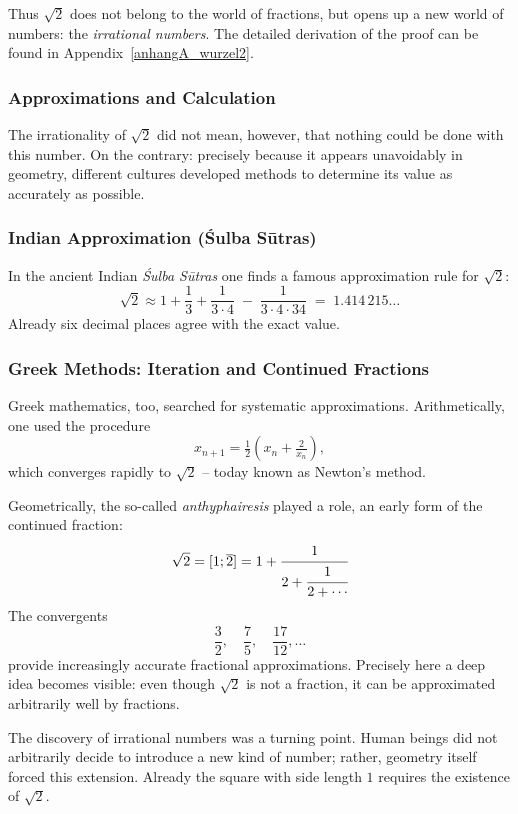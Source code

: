 Thus $\sqrt{2}$ does not belong to the world of fractions,
but opens up a new world of numbers:
the \emph{irrational numbers}.
The detailed derivation of the proof can be found in
Appendix~\ref{anhangA_wurzel2}.

\subsubsection*{Approximations and Calculation}
The irrationality of $\sqrt{2}$ did not mean, however,
that nothing could be done with this number.
On the contrary:
precisely because it appears unavoidably in geometry,
different cultures developed methods
to determine its value as accurately as possible.

\subsubsection*{Indian Approximation (Śulba Sūtras)}
In the ancient Indian \emph{Śulba Sūtras}
one finds a famous approximation rule for $\sqrt{2}$:
\[
\sqrt{2}\approx 1+\frac{1}{3}+\frac{1}{3\cdot 4}\;-\;\frac{1}{3\cdot 4\cdot 34}
\;=\;1.414\,215\ldots
\]
Already six decimal places agree with the exact value.

\subsubsection*{Greek Methods: Iteration and Continued Fractions}
Greek mathematics, too, searched for systematic approximations.
Arithmetically, one used the procedure
\[
x_{n+1}=\tfrac{1}{2}\left(x_n+\tfrac{2}{x_n}\right),
\]
which converges rapidly to $\sqrt{2}$ --
today known as Newton's method.

Geometrically, the so-called \emph{anthyphairesis} played a role,
an early form of the continued fraction:
\[
\sqrt{2}=[1;\overline{2}]
=1+\cfrac{1}{2+\cfrac{1}{2+\cdots}}
\]
The convergents
\[
\frac{3}{2},\quad \frac{7}{5},\quad \frac{17}{12},\dots
\]
provide increasingly accurate fractional approximations.
Precisely here a deep idea becomes visible:
even though $\sqrt{2}$ is not a fraction,
it can be approximated arbitrarily well by fractions.

\begin{NoteBox}
		\label{box:mathdiscovery}
	The discovery of irrational numbers was a turning point.
	Human beings did not arbitrarily decide
	to introduce a new kind of number;
	rather, geometry itself forced this extension.
	Already the square with side length $1$
	requires the existence of $\sqrt{2}$.
\end{NoteBox}

